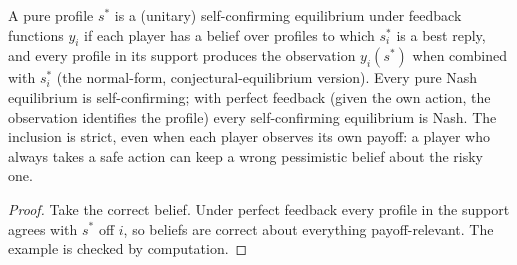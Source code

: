 \begin{theorem}
\label{thm:beh-sce}
\leanok
A pure profile $s^*$ is a (unitary) self-confirming equilibrium under feedback functions $y_i$ if each player has a
belief over profiles to which $s^*_i$ is a best reply, and every profile in its support produces the observation
$y_i(s^*)$ when combined with $s^*_i$ (the normal-form, conjectural-equilibrium version). Every pure Nash equilibrium
is self-confirming; with perfect feedback (given the own action, the observation identifies the profile) every
self-confirming equilibrium is Nash. The inclusion is strict, even when each player observes its own payoff: a player
who always takes a safe action can keep a wrong pessimistic belief about the risky one.
\end{theorem}
\begin{proof}
\leanok
Take the correct belief. Under perfect feedback every profile in the support agrees with $s^*$ off $i$, so beliefs are
correct about everything payoff-relevant. The example is checked by computation.
\end{proof}


